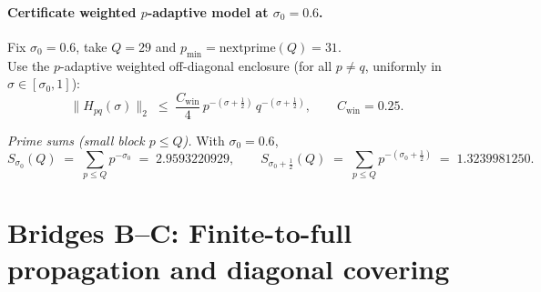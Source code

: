 \documentclass[11pt]{article}
\theoremstyle{definition}
\theoremstyle{remark}
\begin{document}
\iffalse %
\subsection*{Executable finite-block certificate (model; weighted $p$-adaptive; not used)}
\noindent\textbf{Disclaimer (model-only).} This weighted $p$-adaptive Schur-audit is illustrative and \emph{not} used in the main proof chain. Off-diagonal bounds here are model inputs; (P+) is proved solely via the product certificate.
\fi

\paragraph*{Certificate \textemdash{} weighted \(p\)-adaptive model at \(\sigma_0=0.6\).}
Fix \(\sigma_0=0.6\), take \(Q=29\) and \(p_{\min}=\mathrm{nextprime}(Q)=31\).\\
Use the \(p\)-adaptive weighted off-diagonal enclosure (for all \(p\neq q\), uniformly in \(\sigma\in[\sigma_0,1]\)):
\[
\|H_{pq}(\sigma)\|_2 \;\le\; \frac{C_{\mathrm{win}}}{4}\, p^{-(\sigma+\tfrac12)}\, q^{-(\sigma+\tfrac12)},
\qquad C_{\mathrm{win}}=0.25.
\]

\noindent\emph{Prime sums (small block \(p\le Q\)).} With \(\sigma_0=0.6\),
\[
S_{\sigma_0}(Q)\;=\;\sum_{p\le Q} p^{-\sigma_0}\;=\;2.9593220929,\qquad
S_{\sigma_0+\tfrac12}(Q)\;=\;\sum_{p\le Q} p^{-(\sigma_0+\tfrac12)}\;=\;1.3239981250.
\]

\iffalse %
\section{Bridges B--C: Finite-to-full propagation and diagonal covering}
\iffalse
\end{document}
